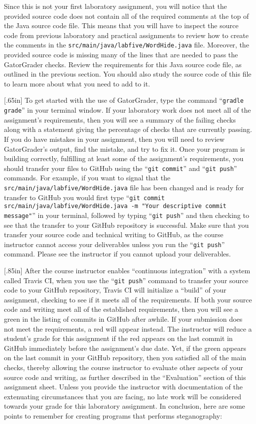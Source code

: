 \documentclass[11pt]{article}
\newcommand{\mainprogramsource}{\lstinline{src/main/java/labfive/WordHide.java}}
\newcommand{\gatorgraderstart}{\command{gradle grade}}
\newcommand{\gitcommit}{\command{git commit}}
\newcommand{\gitpush}{\command{git push}}
\newcommand{\gitcommitmainprogram}{\command{git commit src/main/java/labfive/WordHide.java -m "Your
descriptive commit message"}}
\newcommand{\command}[1]{``\lstinline{#1}''}
\newcommand{\step}[1]{``{#1}''}
\newcommand{\caution}[1]{\null\hfill\LARGE{\faWarning{}}\newline\scriptsize{\em{#1}}}
\newcommand{\checkmark}{\ding{51}}
\newcommand{\naughtmark}{\ding{55}}
\begin{document}
Since this is not your first laboratory assignment, you will notice that the
provided source code does not contain all of the required comments at the top of
the Java source code file. This means that you will have to inspect the source
code from previous laboratory and practical assignments to review how to create
the comments in the \mainprogramsource{} file. Moreover, the provided source
code is missing many of the lines that are needed to pass the GatorGrader
checks. Review the requirements for this Java source code file, as outlined in
the previous section. You should also study the source code of this file to
learn more about what you need to add to it.

\marginnote{\caution{Transfer to GitHub}}[.65in] To get started with the use of
GatorGrader, type the command \gatorgraderstart{} in your terminal window. If
your laboratory work does not meet all of the assignment's requirements, then
you will see a summary of the failing checks along with a statement giving the
percentage of checks that are currently passing. If you do have mistakes in your
assignment, then you will need to review GatorGrader's output, find the mistake,
and try to fix it. Once your program is building correctly, fulfilling at least
some of the assignment's requirements, you should transfer your files to GitHub
using the \gitcommit{} and \gitpush{} commands. For example, if you want to
signal that the \mainprogramsource{} file has been changed and is ready for
transfer to GitHub you would first type \gitcommitmainprogram{} in your
terminal, followed by typing \gitpush{} and then checking to see that the
transfer to your GitHub repository is successful. Make sure that you transfer
your source code and technical writing to GitHub, as the course instructor
cannot access your deliverables unless you run the \gitpush{} command. Please
see the instructor if you cannot upload your deliverables.

\marginnote{\caution{Review all checks}}[.85in] After the course instructor
enables \step{continuous integration} with a system called Travis CI, when you
use the \gitpush{} command to transfer your source code to your GitHub
repository, Travis CI will initialize a \step{build} of your assignment,
checking to see if it meets all of the requirements. If both your source code
and writing meet all of the established requirements, then you will see a green
\checkmark{} in the listing of commits in GitHub after awhile. If your
submission does not meet the requirements, a red \naughtmark{} will appear
instead. The instructor will reduce a student's grade for this assignment if the
red \naughtmark{} appears on the last commit in GitHub immediately before the
assignment's due date. Yet, if the green \checkmark{} appears on the last commit
in your GitHub repository, then you satisfied all of the main checks, thereby
allowing the course instructor to evaluate other aspects of your source code and
writing, as further described in the \step{Evaluation} section of this
assignment sheet. Unless you provide the instructor with documentation of the
extenuating circumstances that you are facing, no late work will be considered
towards your grade for this laboratory assignment. In conclusion, here are some
points to remember for creating programs that performs steganography:
\end{document}
